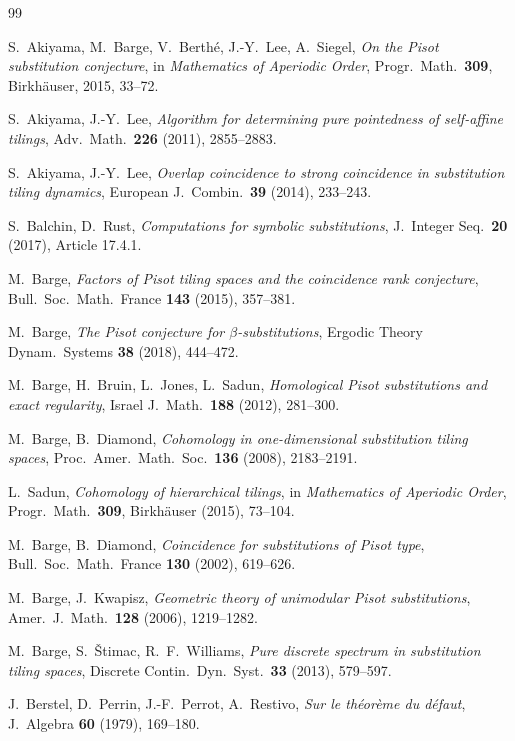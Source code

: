 \documentclass[11pt]{article}
\theoremstyle{plain}
\theoremstyle{definition}
\theoremstyle{remark}
\begin{document}
\begin{thebibliography}{99}

S.~Akiyama, M.~Barge, V.~Berth\'e, J.-Y.~Lee, A.~Siegel,
\emph{On the Pisot substitution conjecture},
in \emph{Mathematics of Aperiodic Order},
Progr.\ Math.\ \textbf{309}, Birkh\"auser, 2015, 33--72.

S.~Akiyama, J.-Y.~Lee,
\emph{Algorithm for determining pure pointedness of self-affine tilings},
Adv.\ Math.\ \textbf{226} (2011), 2855--2883.

S.~Akiyama, J.-Y.~Lee,
\emph{Overlap coincidence to strong coincidence in substitution tiling dynamics},
European J.\ Combin.\ \textbf{39} (2014), 233--243.

S.~Balchin, D.~Rust,
\emph{Computations for symbolic substitutions},
J.\ Integer Seq.\ \textbf{20} (2017), Article 17.4.1.

M.~Barge,
\emph{Factors of Pisot tiling spaces and the coincidence rank conjecture},
Bull.\ Soc.\ Math.\ France \textbf{143} (2015), 357--381.

M.~Barge,
\emph{The Pisot conjecture for $\beta$-substitutions},
Ergodic Theory Dynam.\ Systems \textbf{38} (2018), 444--472.

M.~Barge, H.~Bruin, L.~Jones, L.~Sadun,
\emph{Homological Pisot substitutions and exact regularity},
Israel J.\ Math.\ \textbf{188} (2012), 281--300.

M.~Barge, B.~Diamond,
\emph{Cohomology in one-dimensional substitution tiling spaces},
Proc.\ Amer.\ Math.\ Soc.\ \textbf{136} (2008), 2183--2191.

L.~Sadun,
\emph{Cohomology of hierarchical tilings},
in \emph{Mathematics of Aperiodic Order}, Progr.\ Math.\ \textbf{309},
Birkh\"auser (2015), 73--104.

M.~Barge, B.~Diamond,
\emph{Coincidence for substitutions of Pisot type},
Bull.\ Soc.\ Math.\ France \textbf{130} (2002), 619--626.

M.~Barge, J.~Kwapisz,
\emph{Geometric theory of unimodular Pisot substitutions},
Amer.\ J.\ Math.\ \textbf{128} (2006), 1219--1282.

M.~Barge, S.~\v{S}timac, R.~F.~Williams,
\emph{Pure discrete spectrum in substitution tiling spaces},
Discrete Contin.\ Dyn.\ Syst.\ \textbf{33} (2013), 579--597.

J.~Berstel, D.~Perrin, J.-F.~Perrot, A.~Restivo,
\emph{Sur le th\'eor\`eme du d\'efaut},
J.\ Algebra \textbf{60} (1979), 169--180.


\end{thebibliography}
\end{document}
